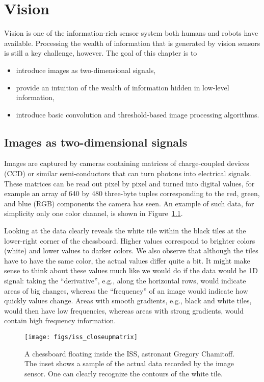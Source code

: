 \chapter{Vision}\label{chap:vision}
Vision is one of the information-rich sensor system both humans and robots have available. Processing the wealth of information that is generated by vision sensors is still a key challenge, however. The goal of this chapter is to
\begin{itemize}
\item introduce images as two-dimensional signals,
\item provide an intuition of the wealth of information hidden in low-level information,
\item introduce basic convolution and threshold-based image processing algorithms.
\end{itemize}

\section{Images as two-dimensional signals}
Images are captured by cameras containing matrices of charge-coupled devices (CCD) or similar semi-conductors that can turn photons into electrical signals. These matrices can be read out pixel by pixel and turned into digital values, for example an array of 640 by 480 three-byte tuples corresponding to the red, green, and blue (RGB) components the camera has seen. An example of such data, for simplicity only one color channel, is shown in Figure~\ref{fig:iss_closeup}.

Looking at the data clearly reveals the white tile within the black tiles at the lower-right corner of the chessboard. Higher values correspond to brighter colors (white) and lower values to darker colors. We also observe that although the tiles have to have the same color, the actual values differ quite a bit. It might make sense to think about these values much like we would do if the data would be 1D signal: taking the ``derivative'', e.g., along the horizontal rows, would indicate areas of big changes, whereas the ``frequency'' of an image  would indicate how quickly values change. Areas with smooth gradients, e.g., black and white tiles, would then have low frequencies, whereas areas with strong gradients, would contain high frequency information.

\begin{figure}[!htb]
    \centering
    \texttt{[image: figs/iss\_closeupmatrix]}
    \caption{A chessboard floating inside the ISS, astronaut Gregory Chamitoff. The inset shows a sample of the actual data recorded by the image sensor. One can clearly recognize the contours of the white tile.}
    \label{fig:iss_closeup}
\end{figure}

